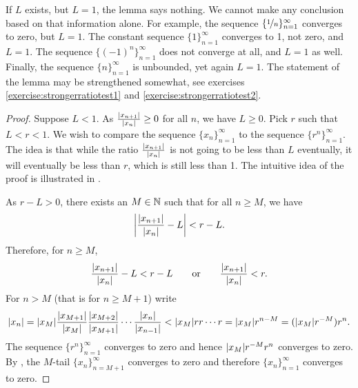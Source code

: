 If $L$ exists, but $L=1$, the lemma says nothing.  We cannot make any
conclusion based on that information alone.  For example,
the sequence $\{ \nicefrac{1}{n} \}_{n=1}^\infty$ converges to zero, but $L=1$.
The constant sequence $\{ 1 \}_{n=1}^\infty$ converges to 1, not zero, and 
$L=1$.  The sequence $\bigl\{ {(-1)}^n \bigr\}_{n=1}^\infty$ does not converge at all, and $L=1$ as
well.
Finally, the sequence $\{  n \}_{n=1}^\infty$ is unbounded, yet again $L=1$.
The statement of the lemma may be strengthened somewhat, see 
exercises \ref{exercise:strongerratiotest1} and
\ref{exercise:strongerratiotest2}.

\begin{proof}
Suppose $L < 1$.
As
$\frac{\lvert {x_{n+1}} \rvert}{\lvert {x_n} \rvert} \geq 0$ for all $n$, we have $L \geq 0$.  Pick
$r$ such that $L < r < 1$.
We wish to compare the sequence $\{ x_n \}_{n=1}^\infty$ to the sequence $\{ r^n \}_{n=1}^\infty$.  The idea is that
while the ratio $\frac{\sabs{x_{n+1}}}{\sabs{x_n}}$ is not going to be less than $L$ eventually,
it will eventually be less than $r$, which is still less than 1.
The intuitive idea of the proof is illustrated in .
\begin{myfigureht}
\caption{The short lines represent the ratios 
$\frac{\sabs{x_{n+1}}}{\sabs{x_n}}$
approaching $L < 1$.\label{figratseq}}
\end{myfigureht}

As $r-L > 0$, there exists an $M \in {\mathbb{N}}$ such that for
all $n \geq M$, we have
\begin{equation*}
\left\lvert {\frac{\lvert {x_{n+1}} \rvert}{\lvert {x_n} \rvert} - L} \right\rvert < r-L .
\end{equation*}
Therefore, for $n \geq M$,
\begin{equation*}
\frac{\lvert {x_{n+1}} \rvert}{\lvert {x_n} \rvert} - L < r-L 
\qquad \text{or} \qquad
\frac{\lvert {x_{n+1}} \rvert}{\lvert {x_n} \rvert} < r .
\end{equation*}
For $n > M$ (that is for $n \geq M+1$)
write
\begin{equation*}
\lvert {x_n} \rvert =
\lvert {x_M} \rvert
\frac{\lvert {x_{M+1}} \rvert}{\lvert {x_{M}} \rvert}
\frac{\lvert {x_{M+2}} \rvert}{\lvert {x_{M+1}} \rvert}
\cdots
\frac{\lvert {x_{n}} \rvert}{\lvert {x_{n-1}} \rvert}
<
\lvert {x_M} \rvert
r r \cdots r = \lvert {x_M} \rvert r^{n-M} = (\lvert {x_M} \rvert r^{-M}) r^n .
\end{equation*}
The sequence $\{ r^n \}_{n=1}^\infty$ converges to zero and hence 
$\lvert {x_M} \rvert r^{-M} r^n$ converges to zero.  By ,
the $M$-tail
$\{x_n\}_{n=M+1}^\infty$ converges to zero and therefore $\{x_n\}_{n=1}^\infty$ converges to zero.


\end{proof}
